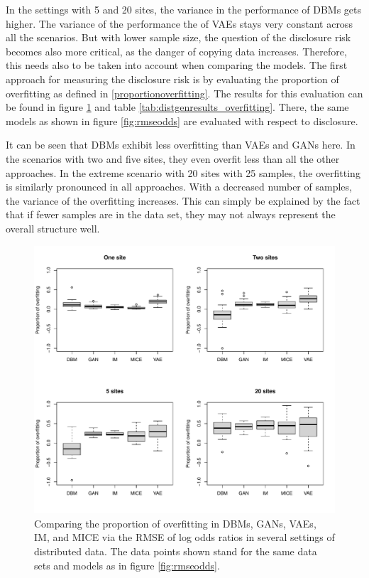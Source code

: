 \documentclass[12pt]{article}
\begin{document}
In the settings with 5 and 20 sites, the variance in the performance of DBMs gets higher.
The variance of the performance the of VAEs stays very constant across all the scenarios.
But with lower sample size, the question of the disclosure risk becomes also more critical, as the danger of copying data increases.
Therefore, this needs also to be taken into account when comparing the models.
The first approach for measuring the disclosure risk is by evaluating the proportion of overfitting as defined in \ref{proportionoverfitting}.
The results for this evaluation can be found in figure \ref{fig:distgenresults_overfitting} and table \ref{tab:distgenresults_overfitting}.
There, the same models as shown in figure \ref{fig:rmseodds} are evaluated with respect to disclosure.

It can be seen that DBMs exhibit less overfitting than VAEs and GANs here.
In the scenarios with two and five sites, they even overfit less than all the other approaches.
In the extreme scenario with 20 sites with 25 samples, the overfitting is similarly pronounced in all approaches.
With a decreased number of samples, the variance of the overfitting increases. This can simply be explained by the fact that if fewer samples are in the data set, they may not always represent the overall structure well.

\begin{figure}[h]
   \centering
   \includegraphics[scale=0.7]{images/overfitting.pdf}
   \caption{Comparing the proportion of overfitting in DBMs, GANs, VAEs, IM, and MICE via the RMSE of log odds ratios in several settings of distributed data.
   The data points shown stand for the same data sets and models as in figure \ref{fig:rmseodds}.}
   \label{fig:distgenresults_overfitting}
\end{figure}
\end{document}
